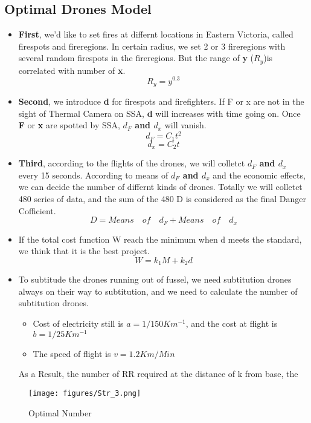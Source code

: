\documentclass{mcmthesis}
\begin{document}
\subsection{Optimal Drones Model}
\begin{itemize}
  \item \textbf{First}, we'd like to set fires at differnt locations in Eastern Victoria, called firespots 
  and fireregions. In certain radius, we set 2 or 3 fireregions with several random firespots
  in the fireregions. But the range of \textbf{y} ($R_y$)is correlated with number of \textbf{x}.
\begin{equation}
  R_y=y^{0.3}
\end{equation}
  \item \textbf{Second}, we introduce \textbf{d} for firespots and firefighters. If F or x are not in the sight of 
  Thermal Camera on SSA, \textbf{d} will increases with time going on. Once \textbf{F} or \textbf{x} are spotted by SSA,
  \textbf{$d_F$ and $d_x$} will vanish.
  \begin{equation}
    d_F=C_1t^2
  \end{equation}
  \begin{equation}
    d_x=C_2t  
  \end{equation}
  \item \textbf{Third}, according to the flights of the drones, we will colletct \textbf{$d_F$ and $d_x$}
  every 15 seconds. According to means of \textbf{$d_F$ and $d_x$} and the economic effects, we can decide the number
  of differnt kinds of drones. Totally we will colletct 480 series of data, and the sum
  of the 480 D is considered as the final Danger Cofficient.
  \begin{equation}
    D=Means \quad of \quad  d_F+ Means\quad  of\quad  d_x
  \end{equation}
  \item If the total cost function W reach the minimum when d meets the standard, we think that it is the best project.
  \begin{equation}
    W=k_1M+k_2d
  \end{equation}
  \item To subtitude the drones running out of fussel, we need subtitution drones
  always on their way to subtitution, and we need to calculate the number of subtitution drones.
 \begin{itemize}
   \item Cost of electricity still is $a=1/150Km^{-1}$, and the cost at flight
   is $b=1/25Km^{-1}$
   \item The speed of flight is $v=1.2Km/Min$
 \end{itemize}
 As a Result, the number of RR required at the distance of k from base, the
\end{itemize}
\begin{figure}[htbp]
  \centering
  \texttt{[image: figures/Str\_3.png]}
  \caption{Optimal Number}
  \label{Optimal Number}
\end{figure}
\newpage
\end{document}
